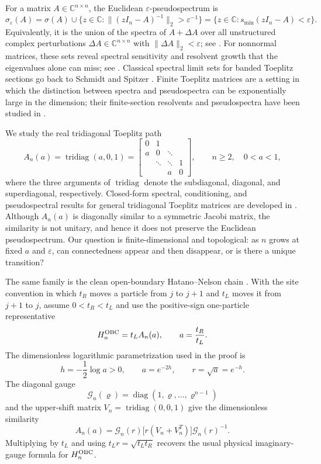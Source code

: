 \documentclass[review,hidelinks,onefignum,onetabnum]{siamart251216}
\DeclareMathOperator{\diag}{diag}
\DeclareMathOperator{\tridiag}{tridiag}
\newcommand{\C}{\mathbb C}
\begin{document}
For a matrix $A\in\C^{n\times n}$, the Euclidean
$\varepsilon$-pseudospectrum is
\begin{equation}\label{eq:intro-pseudospectrum}
 \sigma_\varepsilon(A)
 =\sigma(A)\cup
 \{z\in\C:\lVert(zI_n-A)^{-1}\rVert_2>\varepsilon^{-1}\}
 =\{z\in\C:s_{\min}(zI_n-A)<\varepsilon\}.
\end{equation}
Equivalently, it is the union of the spectra of $A+\Delta A$ over all
unstructured complex perturbations $\Delta A\in\C^{n\times n}$ with
$\lVert\Delta A\rVert_2<\varepsilon$; see
\cite{TrefethenEmbree2005}.  For nonnormal
matrices, these sets reveal spectral sensitivity and resolvent growth
that the eigenvalues alone can miss; see
\cite{Trefethen1997,TrefethenEmbree2005}.  Classical spectral limit sets
for banded Toeplitz sections go back to Schmidt and Spitzer
\cite{SchmidtSpitzer1960}.  Finite Toeplitz matrices are a setting in
which the distinction between spectra and pseudospectra can be
exponentially large in the dimension; their finite-section resolvents
and pseudospectra have been studied in
\cite{BottcherEmbreeTrefethen2002,BottcherGrudsky2005,
BottcherGrudskySilbermann1997,ReichelTrefethen1992}.

We study the real tridiagonal Toeplitz path
\begin{equation}\label{eq:A-matrix}
 A_n(a)=\tridiag(a,0,1)
 =\begin{bmatrix}
 0&1\\
 a&0&\ddots\\
 &\ddots&\ddots&1\\
 &&a&0
 \end{bmatrix},
 \qquad n\geq2,\quad 0<a<1,
\end{equation}
where the three arguments of $\tridiag$ denote the subdiagonal,
diagonal, and superdiagonal, respectively.  Closed-form spectral,
conditioning, and pseudospectral results for general tridiagonal
Toeplitz matrices are developed in
\cite{NoschesePasquiniReichel2013}.  Although $A_n(a)$ is
diagonally similar to a symmetric Jacobi matrix, the similarity is not
unitary, and hence it does not preserve the Euclidean pseudospectrum.
Our question is finite-dimensional and topological: as $n$ grows at
fixed $a$ and $\varepsilon$, can connectedness appear and then disappear, or is
there a unique transition?

The same family is the clean open-boundary Hatano--Nelson chain
\cite{HatanoNelson1996,HatanoNelson1997}.  With the site convention in
which $t_R$ moves a particle from $j$ to $j+1$ and $t_L$ moves it from
$j+1$ to $j$, assume $0<t_R<t_L$ and use the positive-sign one-particle
representative
\[
 H_n^{\rm OBC}=t_LA_n(a),\qquad a=\frac{t_R}{t_L}.
\]
The dimensionless logarithmic parametrization used in the proof is
\[
 h=-\frac12\log a>0,\qquad a=e^{-2h},\qquad
 r=\sqrt a=e^{-h}.
\]
The diagonal gauge
\[
 \mathcal G_n(\varrho)=\diag(1,\varrho,\ldots,\varrho^{n-1})
\]
and the upper-shift matrix \(V_n=\tridiag(0,0,1)\) give the
dimensionless similarity
\[
 A_n(a)=\mathcal G_n(r)\bigl[r(V_n+V_n^T)\bigr]
 \mathcal G_n(r)^{-1}.
\]
Multiplying by \(t_L\) and using \(t_Lr=\sqrt{t_Lt_R}\) recovers the
usual physical imaginary-gauge formula for \(H_n^{\rm OBC}\).
\end{document}

